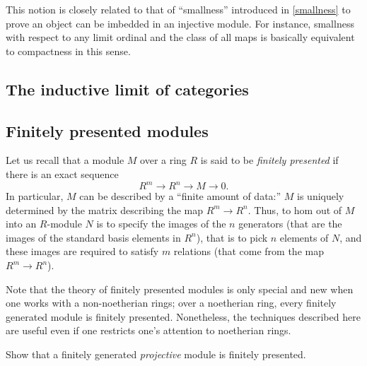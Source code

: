 This notion is closely related to that of ``smallness'' introduced in
\cref{smallness} to prove an object can be imbedded in an injective module.
For instance, smallness with respect to any limit ordinal and the class of all
maps is basically equivalent to compactness in this sense.



\subsection{The inductive limit of categories}



\subsection{Finitely presented modules}


Let us recall that a module $M$ over a ring $R$ is said to be \emph{finitely
presented} if there is an exact sequence
\[ R^m \to R^n \to M \to 0.  \]
In particular, $M$ can be described by a ``finite amount of data:'' $M$ is
uniquely determined by the matrix describing the map $R^m \to R^n$. 
Thus, to hom out of $M$  into an $R$-module $N$ is to specify the images of the $n$ generators 
(that are the images of the standard basis elements in $R^n$), that is to
pick $n$ elements of $N$, and these
images are required to satisfy $m$ relations (that come from the map $R^m \to
R^n$).


Note that the theory of finitely presented modules is only special and new
when one works with a non-noetherian rings; over a noetherian ring, every
finitely generated module is finitely presented. Nonetheless, the techniques
described here are useful even if one restricts one's attention to noetherian
rings.

\begin{exercise} 
Show that a finitely generated \emph{projective} module is finitely presented.
\end{exercise} 


